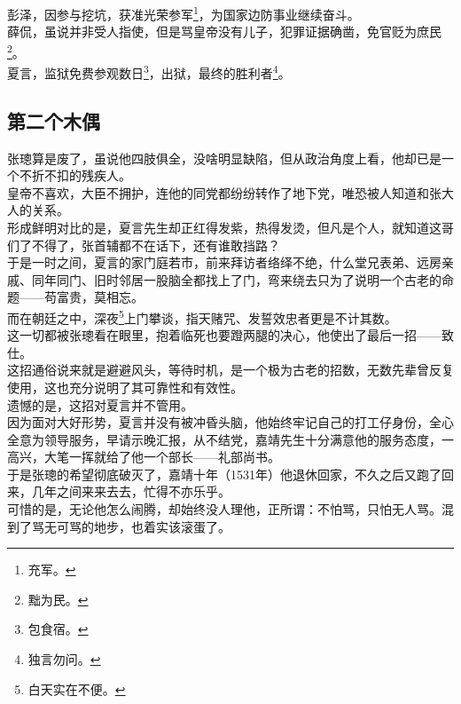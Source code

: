 \begin{multicols}{\theparacolNo}
彭泽，因参与挖坑，获准光荣参军\footnote{充军。}，为国家边防事业继续奋斗。\\

薛侃，虽说并非受人指使，但是骂皇帝没有儿子，犯罪证据确凿，免官贬为庶民\footnote{黜为民。}。\\

夏言，监狱免费参观数日\footnote{包食宿。}，出狱，最终的胜利者\footnote{独言勿问。}。\\

\subsection{第二个木偶}
张璁算是废了，虽说他四肢俱全，没啥明显缺陷，但从政治角度上看，他却已是一个不折不扣的残疾人。\\

皇帝不喜欢，大臣不拥护，连他的同党都纷纷转作了地下党，唯恐被人知道和张大人的关系。\\

形成鲜明对比的是，夏言先生却正红得发紫，热得发烫，但凡是个人，就知道这哥们了不得了，张首辅都不在话下，还有谁敢挡路？\\

于是一时之间，夏言的家门庭若市，前来拜访者络绎不绝，什么堂兄表弟、远房亲戚、同年同门、旧时邻居一股脑全都找上了门，弯来绕去只为了说明一个古老的命题——苟富贵，莫相忘。\\

而在朝廷之中，深夜\footnote{白天实在不便。}上门攀谈，指天赌咒、发誓效忠者更是不计其数。\\

这一切都被张璁看在眼里，抱着临死也要蹬两腿的决心，他使出了最后一招——致仕。\\

这招通俗说来就是避避风头，等待时机，是一个极为古老的招数，无数先辈曾反复使用，这也充分说明了其可靠性和有效性。\\

遗憾的是，这招对夏言并不管用。\\

因为面对大好形势，夏言并没有被冲昏头脑，他始终牢记自己的打工仔身份，全心全意为领导服务，早请示晚汇报，从不结党，嘉靖先生十分满意他的服务态度，一高兴，大笔一挥就给了他一个部长——礼部尚书。\\

于是张璁的希望彻底破灭了，嘉靖十年（1531年）他退休回家，不久之后又跑了回来，几年之间来来去去，忙得不亦乐乎。\\

可惜的是，无论他怎么闹腾，却始终没人理他，正所谓：不怕骂，只怕无人骂。混到了骂无可骂的地步，也着实该滚蛋了。\\


\end{multicols}
